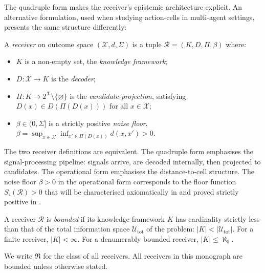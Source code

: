 The quadruple form makes the receiver's epistemic architecture explicit.
An alternative formulation, used when studying action-cells in multi-agent
settings, presents the same structure differently:

\begin{definition}
\label{def:receiver-operational}
A \emph{receiver} on outcome space $(\mathcal{X}, d, \Sigma)$ is a tuple
$\mathcal{R} = (K, D, \Pi, \beta)$ where:
\begin{itemize}
  \item $K$ is a non-empty set, the \emph{knowledge framework};
  \item $D : \mathcal{X} \to K$ is the \emph{decoder};
  \item $\Pi : K \to 2^{\mathcal{X}} \setminus \{\varnothing\}$ is the
    \emph{candidate-projection}, satisfying $D(x) \in D(\Pi(D(x)))$ for
    all $x \in \mathcal{X}$;
  \item $\beta \in (0, \Sigma]$ is a strictly positive \emph{noise floor},
    $\beta = \sup_{x \in \mathcal{X}} \inf_{x' \in \Pi(D(x))} d(x, x') > 0$.
\end{itemize}
\end{definition}

\begin{remark}
The two receiver definitions are equivalent.  The quadruple form emphasises
the signal-processing pipeline: signals arrive, are decoded internally, then
projected to candidates.  The operational form emphasises the
distance-to-cell structure.  The noise floor $\beta > 0$ in the operational
form corresponds to the floor function $S_\flat(\mathcal{R}) > 0$ that will
be characterised axiomatically in  and proved strictly
positive in .
\end{remark}

\begin{definition}
\label{def:bounded-receiver}
A receiver $\mathcal{R}$ is \emph{bounded} if its knowledge framework $K$
has cardinality strictly less than that of the total information space
$\mathcal{U}_{\mathrm{tot}}$ of the problem: $|K| < |\mathcal{U}_{\mathrm{tot}}|$.
For a finite receiver, $|K| < \infty$.  For a denumerably bounded receiver,
$|K| \leq \aleph_0$.
\end{definition}

We write $\mathfrak{R}$ for the class of all receivers.  All receivers in
this monograph are bounded unless otherwise stated.

